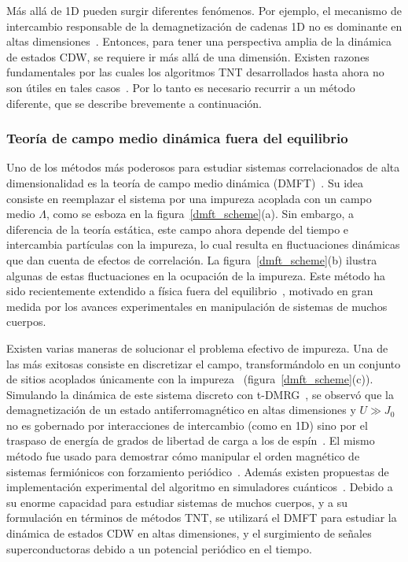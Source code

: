 \documentclass[a4paper,10pt]{article}
\begin{document}
M\'as all\'a de 1D pueden surgir diferentes fen\'omenos. Por ejemplo, el mecanismo de intercambio responsable de la demagnetizaci\'on de cadenas 1D no es dominante en altas dimensiones~\cite{balzer2015prx}. Entonces, para tener una perspectiva amplia de la din\'amica de estados CDW, se requiere ir m\'as all\'a de una dimensi\'on. Existen razones fundamentales por las cuales los algoritmos TNT desarrollados hasta ahora no son \'utiles en tales casos~\cite{schollwock2011ann}. Por lo tanto es necesario recurrir a un m\'etodo diferente, que se describe brevemente a continuaci\'on.

\subsubsection{Teor\'ia de campo medio din\'amica fuera del equilibrio}
Uno de los m\'etodos m\'as poderosos para estudiar sistemas correlacionados de alta dimensionalidad es la teor\'ia de campo medio din\'amica (DMFT)~\cite{georges1996rmp}. Su idea consiste en reemplazar el sistema por una impureza acoplada con un campo medio $\Lambda$, como se esboza en la figura~\ref{dmft_scheme}(a). Sin embargo, a diferencia de la teor\'ia est\'atica, este campo ahora depende del tiempo e intercambia part\'iculas con la impureza, lo cual resulta en fluctuaciones din\'amicas que dan cuenta de efectos de correlaci\'on. La figura~\ref{dmft_scheme}(b) ilustra algunas de estas fluctuaciones en la ocupaci\'on de la impureza. Este m\'etodo ha sido recientemente extendido a f\'isica fuera del equilibrio~\cite{eckstein2014rmp}, motivado en gran medida por los avances experimentales en manipulaci\'on de sistemas de muchos cuerpos.

Existen varias maneras de solucionar el problema efectivo de impureza. Una de las m\'as exitosas consiste en discretizar el campo, transform\'andolo en un conjunto de sitios acoplados \'unicamente con la impureza~\cite{gramsch2014prb} (figura~\ref{dmft_scheme}(c)). Simulando la din\'amica de este sistema discreto con t-DMRG~\cite{alexander2014prb}, se observ\'o que la demagnetizaci\'on de un estado antiferromagn\'etico en altas dimensiones y $U\gg J_0$ no es gobernado por interacciones de intercambio (como en 1D) sino por el traspaso de energ\'ia de grados de libertad de carga a los de esp\'in~\cite{balzer2015prx}.
El mismo m\'etodo fue usado para demostrar c\'omo manipular el orden magn\'etico de sistemas fermi\'onicos con forzamiento peri\'odico~\cite{nosotros2017driven}. Adem\'as existen propuestas de implementaci\'on experimental del algoritmo en simuladores cu\'anticos~\cite{juha2016sci}. Debido a su enorme capacidad para estudiar sistemas de muchos cuerpos, y a su formulaci\'on en t\'erminos de m\'etodos TNT, se utilizar\'a el DMFT para estudiar la din\'amica de estados CDW en altas dimensiones, y el surgimiento de se\~nales superconductoras debido a un potencial peri\'odico en el tiempo.
\end{document}
